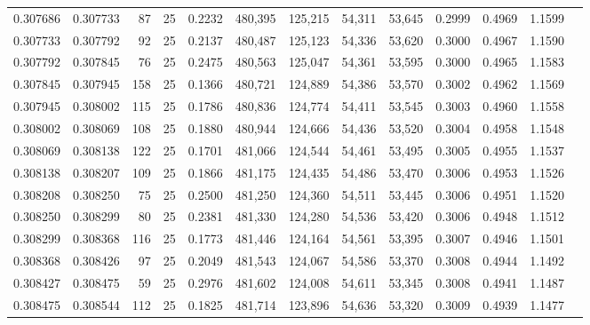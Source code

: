 \begin{tabular}{rrrrrrrrrrrrr}
0.307686 & 0.307733 &    87 &  25 &                                     0.2232 & 480,395 & 125,215 &  54,311 &  53,645 & 0.2999 & 0.4969 & 1.1599 \\
0.307733 & 0.307792 &    92 &  25 &                                     0.2137 & 480,487 & 125,123 &  54,336 &  53,620 & 0.3000 & 0.4967 & 1.1590 \\
0.307792 & 0.307845 &    76 &  25 &                                     0.2475 & 480,563 & 125,047 &  54,361 &  53,595 & 0.3000 & 0.4965 & 1.1583 \\
0.307845 & 0.307945 &   158 &  25 &                                     0.1366 & 480,721 & 124,889 &  54,386 &  53,570 & 0.3002 & 0.4962 & 1.1569 \\
0.307945 & 0.308002 &   115 &  25 &                                     0.1786 & 480,836 & 124,774 &  54,411 &  53,545 & 0.3003 & 0.4960 & 1.1558 \\
0.308002 & 0.308069 &   108 &  25 &                                     0.1880 & 480,944 & 124,666 &  54,436 &  53,520 & 0.3004 & 0.4958 & 1.1548 \\
0.308069 & 0.308138 &   122 &  25 &                                     0.1701 & 481,066 & 124,544 &  54,461 &  53,495 & 0.3005 & 0.4955 & 1.1537 \\
0.308138 & 0.308207 &   109 &  25 &                                     0.1866 & 481,175 & 124,435 &  54,486 &  53,470 & 0.3006 & 0.4953 & 1.1526 \\
0.308208 & 0.308250 &    75 &  25 &                                     0.2500 & 481,250 & 124,360 &  54,511 &  53,445 & 0.3006 & 0.4951 & 1.1520 \\
0.308250 & 0.308299 &    80 &  25 &                                     0.2381 & 481,330 & 124,280 &  54,536 &  53,420 & 0.3006 & 0.4948 & 1.1512 \\
0.308299 & 0.308368 &   116 &  25 &                                     0.1773 & 481,446 & 124,164 &  54,561 &  53,395 & 0.3007 & 0.4946 & 1.1501 \\
0.308368 & 0.308426 &    97 &  25 &                                     0.2049 & 481,543 & 124,067 &  54,586 &  53,370 & 0.3008 & 0.4944 & 1.1492 \\
0.308427 & 0.308475 &    59 &  25 &                                     0.2976 & 481,602 & 124,008 &  54,611 &  53,345 & 0.3008 & 0.4941 & 1.1487 \\
0.308475 & 0.308544 &   112 &  25 &                                     0.1825 & 481,714 & 123,896 &  54,636 &  53,320 & 0.3009 & 0.4939 & 1.1477 \\

\end{tabular}
